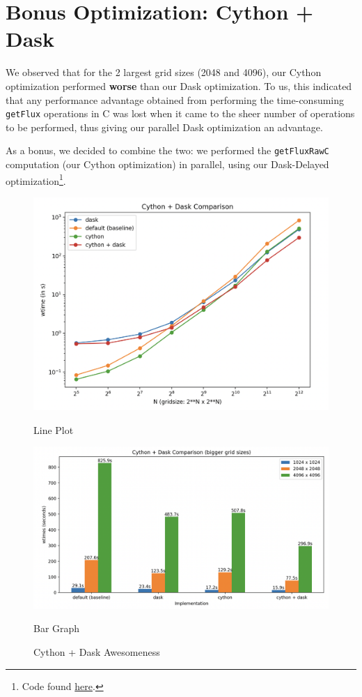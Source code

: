 \documentclass[a4paper,10pt]{article}
\begin{document}
\section{Bonus Optimization: Cython + Dask}
We observed that for the 2 largest grid sizes (2048 and 4096), our Cython optimization performed \textbf{worse} than our Dask optimization.
To us, this indicated that any performance advantage obtained from performing the time-consuming \verb|getFlux| operations in C was lost when it came to the sheer number of operations to be performed, thus giving our parallel Dask optimization an advantage.

As a bonus, we decided to combine the two: we performed the \verb|getFluxRawC| computation (our Cython optimization) in parallel, using our Dask-Delayed optimization\footnote{Code found \href{https://github.com/paulmyr/DD2358-HPC25/blob/master/10_project_rishi_paul/code/cython/finitevolume_cython_dask.py\#L305}{here}.}.
\begin{figure}[h!]
   \begin{minipage}{0.5\textwidth}
       \centering
       \includegraphics[width=\linewidth]{images/cython_dask/cython_dask_final_plot.png}
      \caption{Line Plot}
       \label{fig:cython_dask_final_plot}
   \end{minipage}
   \hspace{0.1cm}
   \begin{minipage}{0.5\textwidth}
       \centering
       \includegraphics[width=\linewidth]{images/cython_dask/cython_dask_final_bar.png}
      \caption{Bar Graph}
      \label{fig:cython_dask_final_bar}
  \end{minipage}
  \caption{Cython + Dask Awesomeness}
\end{figure}
\end{document}
